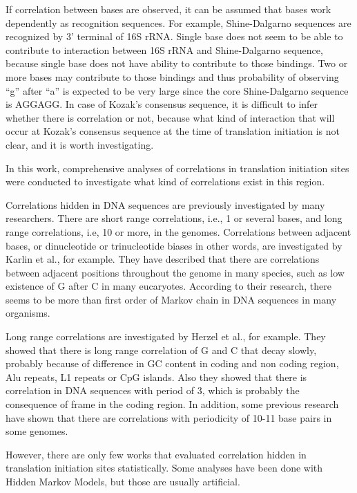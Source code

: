 If correlation between bases are observed, it can be assumed that
bases work dependently as recognition sequences. For example,
Shine-Dalgarno sequences are recognized by 3' terminal of 16S
rRNA. Single base does not seem to be able to contribute to
interaction between 16S rRNA and Shine-Dalgarno sequence, because
single base does not have ability to contribute to those bindings. Two
or more bases may contribute to those bindings and thus probability of
observing ``g'' after ``a'' is expected to be very large since the
core Shine-Dalgarno sequence is AGGAGG. In case of Kozak's consensus
sequence, it is difficult to infer whether there is correlation or
not, because what kind of interaction that will occur at Kozak's
consensus sequence at the time of translation initiation is not clear,
and it is worth investigating.

In this work, comprehensive analyses of correlations in translation
initiation sites were conducted to investigate what kind of correlations
exist in this region.

Correlations hidden in DNA sequences are previously investigated by many
researchers. There are short range correlations, i.e., 1 or several
bases, and long range correlations, i.e, 10 or more, in the
genomes. Correlations between adjacent bases, or dinucleotide or
trinucleotide biases in other words, are investigated by Karlin et
al.\cite{label301}, for example. They have described that there are
correlations between adjacent positions throughout the genome in many
species, such as low existence of G after C in many
eucaryotes. According to their research, there seems to be more than
first order of Markov chain in DNA sequences in many organisms.

Long range correlations are investigated by Herzel et
al.\cite{label511}, for example. They showed that there is long range
correlation of G and C that decay slowly, probably because of difference
in GC content in coding and non coding region, Alu repeats, L1 repeats
or CpG islands. Also they showed that there is correlation in DNA
sequences with period of 3, which is probably the consequence of frame
in the coding region. In addition, some previous research have shown
that there are correlations with periodicity of 10-11 base pairs in some
genomes\cite{label511,label509}.

However, there are only few works that evaluated correlation hidden in
translation initiation sites statistically. Some analyses have been done
with Hidden Markov Models\cite{label515}, but those are usually
artificial.

